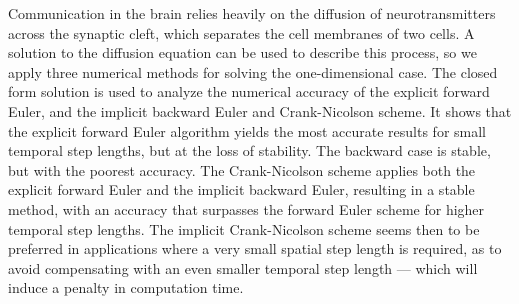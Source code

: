 
Communication in the brain relies heavily on the diffusion of neurotransmitters
across the synaptic cleft, which separates the cell membranes of two cells.
A solution to the diffusion equation can be used to describe this process, so 
we apply three numerical methods for solving the one-dimensional case. The closed
form solution is used to analyze the numerical accuracy of the explicit
forward Euler, and the implicit backward Euler and Crank-Nicolson scheme. It
shows that the explicit forward Euler algorithm yields the most accurate
results for small temporal step lengths, but at the loss of stability.
The backward case is stable, but with the
poorest accuracy. The Crank-Nicolson scheme applies both
the explicit forward Euler and the implicit backward Euler, resulting in a
stable method, with an accuracy that surpasses the forward Euler scheme for
higher temporal step lengths. 
The implicit Crank-Nicolson scheme seems
then to be preferred in applications where a very small spatial step length is required,
as to avoid compensating with an even smaller temporal step length --- which will
induce a penalty in computation time.

%
%

